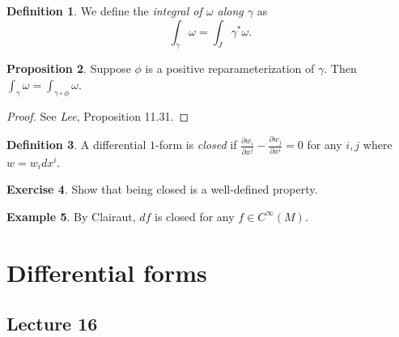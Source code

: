 \documentclass[10pt,letterpaper,cm]{nupset}
\theoremstyle{definition}
\newtheorem{definition}{Definition}[subsection]
\newtheorem{exmp}[definition]{Example}
\theoremstyle{theorem}
\newtheorem{prop}[definition]{Proposition}
\newtheorem{exercise}[definition]{Exercise}
\theoremstyle{remark}
\newcommand{\1}{\mathbf{1}}
\newcommand{\0}{\vec 0}
\begin{document}
\begin{definition}
We define the \textit{integral of $\omega$ along $\gamma$} as $$\int_{\gamma} \omega = \int_J \gamma^{\ast}\omega.$$ 
\end{definition}

\begin{prop}
Suppose $\phi$ is a positive reparameterization of $\gamma$. Then $\int_{\gamma} \omega = \int_{\gamma \circ \phi} \omega$.
\end{prop}
\begin{proof}
See \textit{Lee}, Proposition 11.31.
\end{proof}

\begin{definition}
A differential $1$-form is \textit{closed} if $\frac{\partial{w_i}}{\partial{x^j}} - \frac{\partial{w_j}}{\partial{x^i}} =0$ for any $i,j$ where $w = w_i dx^i$.
\end{definition}

\begin{exercise}
Show that being closed is a well-defined property.
\end{exercise}

\begin{exmp}
By Clairaut, $df$ is closed for any $f\in C^{\infty}(M)$. 
\end{exmp}

\section{Differential forms}

\subsection{Lecture 16}
\end{document}
